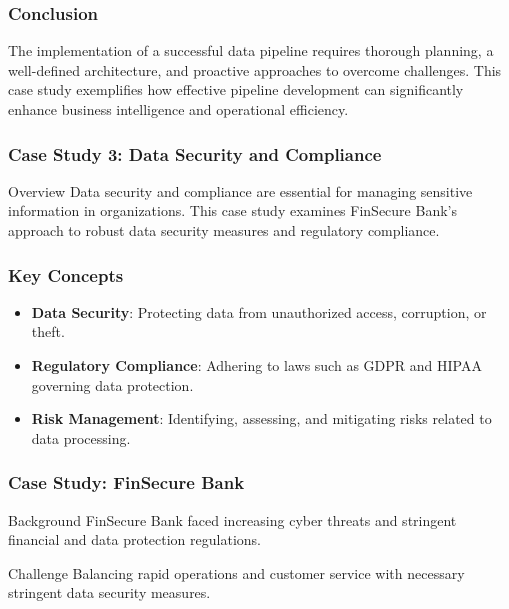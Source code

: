 \documentclass{beamer}
\begin{document}
\begin{frame}
    \frametitle{Conclusion}
    The implementation of a successful data pipeline requires thorough planning, a well-defined architecture, and proactive approaches to overcome challenges. This case study exemplifies how effective pipeline development can significantly enhance business intelligence and operational efficiency.
\end{frame}

\begin{frame}[fragile]
    \frametitle{Case Study 3: Data Security and Compliance}
    \begin{block}{Overview}
        Data security and compliance are essential for managing sensitive information in organizations.
        This case study examines FinSecure Bank's approach to robust data security measures and regulatory compliance.
    \end{block}
\end{frame}

\begin{frame}[fragile]
    \frametitle{Key Concepts}
    \begin{itemize}
        \item \textbf{Data Security}: Protecting data from unauthorized access, corruption, or theft.
        \item \textbf{Regulatory Compliance}: Adhering to laws such as GDPR and HIPAA governing data protection.
        \item \textbf{Risk Management}: Identifying, assessing, and mitigating risks related to data processing.
    \end{itemize}
\end{frame}

\begin{frame}[fragile]
    \frametitle{Case Study: FinSecure Bank}
    \begin{block}{Background}
        FinSecure Bank faced increasing cyber threats and stringent financial and data protection regulations.
    \end{block}
    
    \begin{block}{Challenge}
        Balancing rapid operations and customer service with necessary stringent data security measures.
    \end{block}
\end{frame}
\end{document}
